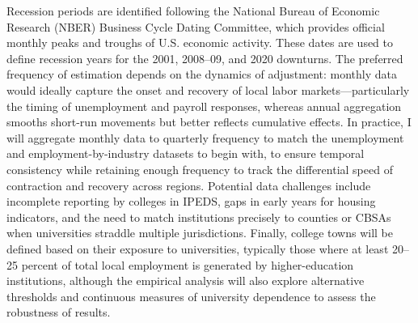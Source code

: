 \noindent Recession periods are identified following the National Bureau of Economic Research (NBER) Business Cycle Dating Committee, which provides official monthly peaks and troughs of U.S. economic activity. These dates are used to define recession years for the 2001, 2008–09, and 2020 downturns. The preferred frequency of estimation depends on the dynamics of adjustment: monthly data would ideally capture the onset and recovery of local labor markets—particularly the timing of unemployment and payroll responses, whereas annual aggregation smooths short-run movements but better reflects cumulative effects. In practice, I will aggregate monthly data to quarterly frequency to match the unemployment and employment-by-industry datasets to begin with, to ensure temporal consistency while retaining enough frequency to track the differential speed of contraction and recovery across regions. Potential data challenges include incomplete reporting by colleges in IPEDS, gaps in early years for housing indicators, and the need to match institutions precisely to counties or CBSAs when universities straddle multiple jurisdictions. Finally, college towns will be defined based on their exposure to universities, typically those where at least 20–25 percent of total local employment is generated by higher-education institutions, although the empirical analysis will also explore alternative thresholds and continuous measures of university dependence to assess the robustness of results.








